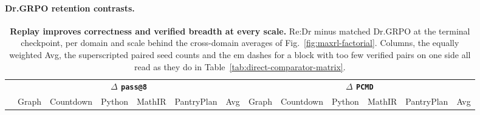 \documentclass{article}
\newcommand{\1}{\mathbf 1}
\newcommand{\pmd}{\texttt{PCMD}}
\theoremstyle{remark}
\theoremstyle{definition}
\theoremstyle{plain}
\begin{document}
\crossscaletablematerial

\paragraph{Dr.GRPO retention contrasts.}
\label{app:retention-numerical-detail}

\begin{table}[!tbp]
  \centering
  \caption{\textbf{Replay improves correctness and verified breadth at every
  scale.} Re:Dr minus matched Dr.GRPO at the terminal checkpoint, per domain
  and scale behind the cross-domain averages of
  Fig.~\ref{fig:maxrl-factorial}. Columns, the equally weighted Avg, the
  superscripted paired seed counts and the em dashes for a block with too few
  verified pairs on one side all read as they do in
  Table~\ref{tab:direct-comparator-matrix}.}
  \label{tab:cross-scale-terminal-effects}
  \scriptsize
  \setlength{\tabcolsep}{1.4pt}
  \renewcommand{\arraystretch}{0.92}
  \begin{tabular}{@{}l*{12}{r}@{}}
    \toprule
    & \multicolumn{6}{c}{\textbf{$\Delta$ \texttt{pass@8}}}
      & \multicolumn{6}{c}{\textbf{$\Delta$ \pmd{}}} \\
    \cmidrule(lr){2-7}\cmidrule(l){8-13}
    & Graph & Countdown & Python & MathIR & PantryPlan & Avg
      & Graph & Countdown & Python & MathIR & PantryPlan & Avg \\
    \midrule
    
  \end{tabular}
\end{table}
\end{document}
